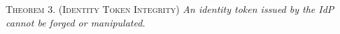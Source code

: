 
\newc
\vspace{1mm}
\noindent\textsc{Theorem 3. (Identity Token Integrity)} {\em An identity token issued by the IdP cannot be forged or manipulated.}



